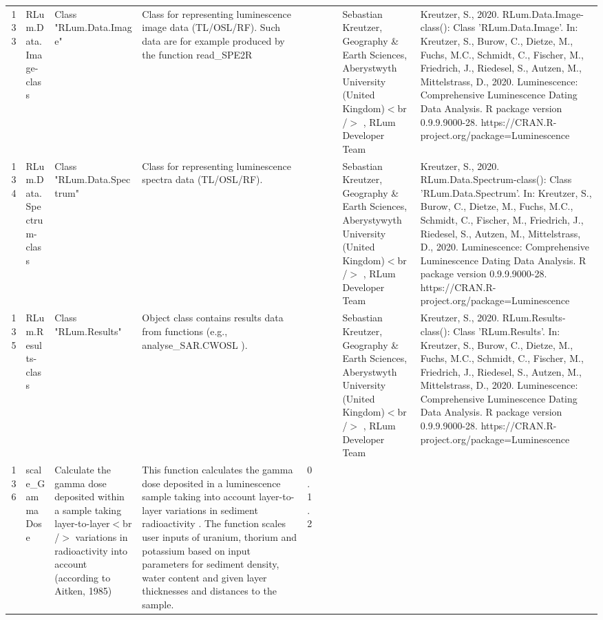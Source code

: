 \begin{table}[ht]
\begin{tabular}{rllllllll}
 \\ 
  133 & RLum.Data.Image-class & Class  "RLum.Data.Image" & Class for representing luminescence image data (TL/OSL/RF). Such data are for example produced by the function  read\_SPE2R &  &  &  & Sebastian Kreutzer, Geography \& Earth Sciences, Aberystwyth University (United Kingdom)$<$br /$>$ , RLum Developer Team & Kreutzer, S., 2020. RLum.Data.Image-class(): Class 'RLum.Data.Image'. In: Kreutzer, S., Burow, C., Dietze, M., Fuchs, M.C., Schmidt, C., Fischer, M., Friedrich, J., Riedesel, S., Autzen, M., Mittelstrass, D., 2020. Luminescence: Comprehensive Luminescence Dating Data Analysis. R package version 0.9.9.9000-28. https://CRAN.R-project.org/package=Luminescence
 \\ 
  134 & RLum.Data.Spectrum-class & Class  "RLum.Data.Spectrum" & Class for representing luminescence spectra data (TL/OSL/RF). &  &  &  & Sebastian Kreutzer, Geography \& Earth Sciences, Aberystywyth University (United Kingdom)$<$br /$>$ , RLum Developer Team & Kreutzer, S., 2020. RLum.Data.Spectrum-class(): Class 'RLum.Data.Spectrum'. In: Kreutzer, S., Burow, C., Dietze, M., Fuchs, M.C., Schmidt, C., Fischer, M., Friedrich, J., Riedesel, S., Autzen, M., Mittelstrass, D., 2020. Luminescence: Comprehensive Luminescence Dating Data Analysis. R package version 0.9.9.9000-28. https://CRAN.R-project.org/package=Luminescence
 \\ 
  135 & RLum.Results-class & Class  "RLum.Results" & Object class contains results data from functions (e.g.,  analyse\_SAR.CWOSL ). &  &  &  & Sebastian Kreutzer, Geography \& Earth Sciences, Aberystwyth University (United Kingdom)$<$br /$>$ , RLum Developer Team & Kreutzer, S., 2020. RLum.Results-class(): Class 'RLum.Results'. In: Kreutzer, S., Burow, C., Dietze, M., Fuchs, M.C., Schmidt, C., Fischer, M., Friedrich, J., Riedesel, S., Autzen, M., Mittelstrass, D., 2020. Luminescence: Comprehensive Luminescence Dating Data Analysis. R package version 0.9.9.9000-28. https://CRAN.R-project.org/package=Luminescence
 \\ 
  136 & scale\_GammaDose & Calculate the gamma dose deposited within a sample taking layer-to-layer$<$br /$>$ variations in radioactivity into account (according to Aitken, 1985) & This function calculates the gamma dose deposited in a luminescence sample taking into account layer-to-layer variations in sediment radioactivity . The function scales user inputs of uranium, thorium and potassium based on input parameters for sediment density, water content and given layer thicknesses and distances to the sample. & 0.1.2

\end{tabular}
\end{table}
